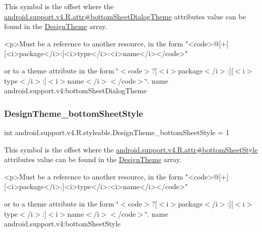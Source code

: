 This symbol is the offset where the \hyperlink{classandroid_1_1support_1_1v4_1_1R_1_1attr_a5d2141f05a94ea6df7aa87c76d4c1613}{android.\+support.\+v4.\+R.\+attr\#bottom\+Sheet\+Dialog\+Theme} attribute\textquotesingle{}s value can be found in the \hyperlink{classandroid_1_1support_1_1v4_1_1R_1_1styleable_ac24c90108ad2b0d7b729f30efc3f8de9}{Design\+Theme} array.

\begin{DoxyVerb}      <p>Must be a reference to another resource, in the form "<code>@[+][<i>package</i>:]<i>type</i>:<i>name</i></code>"
\end{DoxyVerb}
 or to a theme attribute in the form \char`\"{}$<$code$>$?\mbox{[}$<$i$>$package$<$/i$>$\+:\mbox{]}\mbox{[}$<$i$>$type$<$/i$>$\+:\mbox{]}$<$i$>$name$<$/i$>$$<$/code$>$\char`\"{}.  name android.\+support.\+v4\+:bottom\+Sheet\+Dialog\+Theme \mbox{\label{classandroid_1_1support_1_1v4_1_1R_1_1styleable_af97dd7c6ce7914e917496c10a232ef71}} 
\subsubsection{\texorpdfstring{Design\+Theme\+\_\+bottom\+Sheet\+Style}{DesignTheme\_bottomSheetStyle}}
{\footnotesize\ttfamily int android.\+support.\+v4.\+R.\+styleable.\+Design\+Theme\+\_\+bottom\+Sheet\+Style = 1\hspace{0.3cm}{\ttfamily [static]}}

This symbol is the offset where the \hyperlink{classandroid_1_1support_1_1v4_1_1R_1_1attr_a669cde3e095c7754856eca842274e111}{android.\+support.\+v4.\+R.\+attr\#bottom\+Sheet\+Style} attribute\textquotesingle{}s value can be found in the \hyperlink{classandroid_1_1support_1_1v4_1_1R_1_1styleable_ac24c90108ad2b0d7b729f30efc3f8de9}{Design\+Theme} array.

\begin{DoxyVerb}      <p>Must be a reference to another resource, in the form "<code>@[+][<i>package</i>:]<i>type</i>:<i>name</i></code>"
\end{DoxyVerb}
 or to a theme attribute in the form \char`\"{}$<$code$>$?\mbox{[}$<$i$>$package$<$/i$>$\+:\mbox{]}\mbox{[}$<$i$>$type$<$/i$>$\+:\mbox{]}$<$i$>$name$<$/i$>$$<$/code$>$\char`\"{}.  name android.\+support.\+v4\+:bottom\+Sheet\+Style \mbox{\label{classandroid_1_1support_1_1v4_1_1R_1_1styleable_a6fcc0cb0fae8a6fc95519de5b4299973}} 
